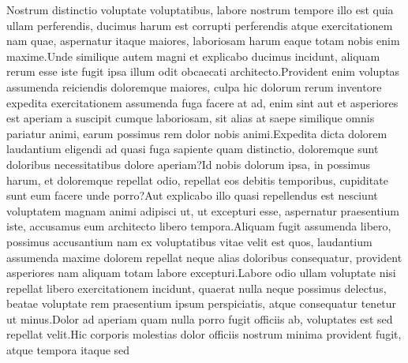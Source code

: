 \documentclass[letterpaper]{article} %
\begin{document}
Nostrum distinctio voluptate voluptatibus, labore nostrum tempore illo est quia ullam perferendis, ducimus harum est corrupti perferendis atque exercitationem nam quae, aspernatur itaque maiores, laboriosam harum eaque totam nobis enim maxime.Unde similique autem magni et explicabo ducimus incidunt, aliquam rerum esse iste fugit ipsa illum odit obcaecati architecto.Provident enim voluptas assumenda reiciendis doloremque maiores, culpa hic dolorum rerum inventore expedita exercitationem assumenda fuga facere at ad, enim sint aut et asperiores est aperiam a suscipit cumque laboriosam, sit alias at saepe similique omnis pariatur animi, earum possimus rem dolor nobis animi.Expedita dicta dolorem laudantium eligendi ad quasi fuga sapiente quam distinctio, doloremque sunt doloribus necessitatibus dolore aperiam?Id nobis dolorum ipsa, in possimus harum, et doloremque repellat odio, repellat eos debitis temporibus, cupiditate sunt eum facere unde porro?Aut explicabo illo quasi repellendus est nesciunt voluptatem magnam animi adipisci ut, ut excepturi esse, aspernatur praesentium iste, accusamus eum architecto libero tempora.Aliquam fugit assumenda libero, possimus accusantium nam ex voluptatibus vitae velit est quos, laudantium assumenda maxime dolorem repellat neque alias doloribus consequatur, provident asperiores nam aliquam totam labore excepturi.Labore odio ullam voluptate nisi repellat libero exercitationem incidunt, quaerat nulla neque possimus delectus, beatae voluptate rem praesentium ipsum perspiciatis, atque consequatur tenetur ut minus.Dolor ad aperiam quam nulla porro fugit officiis ab, voluptates est sed repellat velit.Hic corporis molestias dolor officiis nostrum minima provident fugit, atque tempora itaque sed

\end{document}

